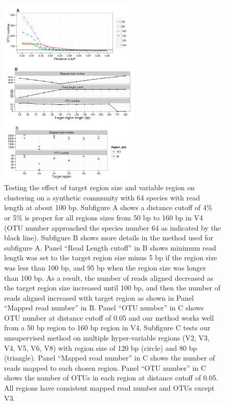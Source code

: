 \documentclass[]{msu-thesis}
\begin{document}
\begin{figure}[tbph!]
  \centering
  \includegraphics[width=0.60\textwidth]{figs/chap2_figS2}
  \caption[Testing the effect of target region size and variable region on clustering on a synthetic community]{Testing the effect of target region size and variable region on clustering on a synthetic community with 64 species with read length at about 100 bp. Subfigure A shows a distance cutoff of 4\% or 5\% is proper for all regions sizes from 50 bp to 160 bp in V4 (OTU number approached the species number 64 as indicated by the black line).  Subfigure B shows more details in the method used for subfigure A. Panel “Read Length cutoff” in B shows minimum read length was set to the target region size minus 5 bp if the region size was less than 100 bp, and 95 bp when the region size was longer than 100 bp. As a result, the number of reads aligned decreased as the target region size increased until 100 bp, and then the number of reads aligned increased with target region as shown in Panel “Mapped read number” in B. Panel “OTU number” in C shows OTU number at distance cutoff of 0.05 and our method works well from a 50 bp region to 160 bp region in V4. Subfigure C tests our unsupervised method on multiple hyper-variable regions (V2, V3, V4, V5, V6, V8) with region size of 120 bp (circle) and 80 bp (triangle). Panel “Mapped read number” in C shows the number of reads mapped to each chosen region. Panel “OTU number” in C shows the number of OTUs in each region at distance cutoff of 0.05. All regions have consistent mapped read number and OTUs except V3.}
  \label{fig:chap2FigS2}
\end{figure}
\end{document}
